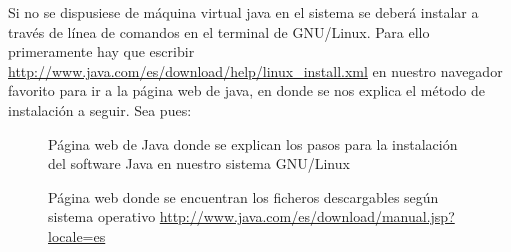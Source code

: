 Si no se dispusiese de máquina virtual java en el sistema se deberá instalar a través de línea de comandos en el terminal de GNU/Linux.
Para ello primeramente hay que escribir \url{http://www.java.com/es/download/help/linux_install.xml} en nuestro navegador favorito para ir a la página web de java, en donde se nos explica el método de instalación a seguir. Sea pues:

\begin{figure}[H]
\caption{Página web de Java donde se explican los pasos para la instalación del software Java en nuestro sistema GNU/Linux}
\end{figure}

\begin{figure}[H]
\caption{Página web donde se encuentran los ficheros descargables según sistema operativo \url{http://www.java.com/es/download/manual.jsp?locale=es}}
\end{figure}

